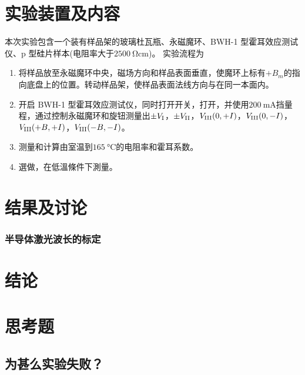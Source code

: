 \documentclass[font=default]{mpltx}
\begin{document}
\section{实验装置及内容}
本次实验包含一个装有样品架的玻璃杜瓦瓶、永磁魔环、BWH-1 型霍耳效应测试仪、p 型硅片样本(电阻率大于$\qty{2500}{\ohm\cm}$)。
实验流程为
\begin{enumerate}
	\item 将样品放至永磁魔环中央，磁场方向和样品表面垂直，使魔环上标有$+B_m$的\buttombox[blue]{$\downarrow$}指向底盘上的\buttombox[red]{$\rightarrow$}位置。转动样品架，使样品表面法线方向与\buttombox[blue]{$\downarrow$}在同一本面内。
	\item 开启 BWH-1 型霍耳效应测试仪，同时打开开关，打开，并使用$\qty{200}{\mA}$挡量程，通过控制永磁魔环和旋钮测量出$\pm V_{\rm{I}}$，$\pm V_{\rm{II}}$，$V_{\rm{III}}(0,+I)$，$V_{\rm{III}}(0,-I)$，$V_{\rm{III}}(+B,+I)$，$V_{\rm{III}}(-B,-I)$。
	\item 测量和计算由室温到$\qty{165}{\degreeCelsius}$的电阻率和霍耳系数。
	\item 選做，在低溫條件下測量。
\end{enumerate}
\section{结果及讨论}
\subsubsection{半导体激光波长的标定}

\section{结论}



\clearpage %
\appendix %
\section{思考题}\label{app:exercise}
\subsection{为甚么实验失败？}
\end{document}
